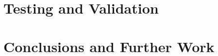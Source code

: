 \documentclass[ openright,titlepage,numbers=noenddot,headinclude,%
                footinclude=true,BCOR=5mm,paper=a4,fontsize=11pt,a4paper,english%
                ]{scrreprt}
\begin{document}
\chapter{Testing and Validation}
\label{Chapters/Testing-and-Validation}

\chapter{Conclusions and Further Work}
\label{Chapters/Conclusion-and-Further-Work}



%

\end{document}
